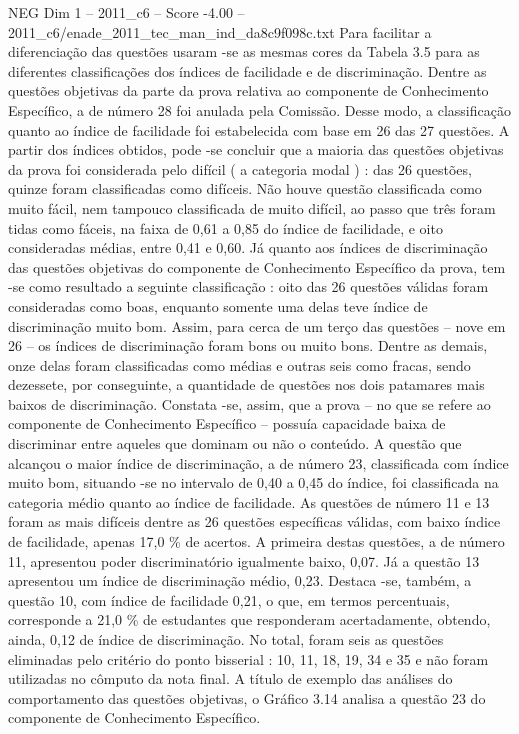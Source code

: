 \begin{textsample}{NEG Dim 1 – 2011\_c6 – Score -4.00 – 2011\_c6/enade\_2011\_tec\_man\_ind\_da8c9f098c.txt}
Para facilitar a diferenciação das questões usaram -se as mesmas cores da Tabela 3.5 para as diferentes classificações dos índices de facilidade e de discriminação.
Dentre as questões objetivas da parte da prova relativa ao componente de Conhecimento Específico, a de número 28 foi anulada pela Comissão.
Desse modo, a classificação quanto ao índice de facilidade foi estabelecida com base em 26 das 27 questões.
A partir dos índices obtidos, pode -se concluir que a maioria das questões objetivas da prova foi considerada pelo difícil ( a categoria modal ) : das 26 questões, quinze foram classificadas como difíceis.
Não houve questão classificada como muito fácil, nem tampouco classificada de muito difícil, ao passo que três foram tidas como fáceis, na faixa de 0,61 a 0,85 do índice de facilidade, e oito consideradas médias, entre 0,41 e 0,60.
Já quanto aos índices de discriminação das questões objetivas do componente de Conhecimento Específico da prova, tem -se como resultado a seguinte classificação : oito das 26 questões válidas foram consideradas como boas, enquanto somente uma delas teve índice de discriminação muito bom.
Assim, para cerca de um terço das questões – nove em 26 – os índices de discriminação foram bons ou muito bons.
Dentre as demais, onze delas foram classificadas como médias e outras seis como fracas, sendo dezessete, por conseguinte, a quantidade de questões nos dois patamares mais baixos de discriminação.
Constata -se, assim, que a prova – no que se refere ao componente de Conhecimento Específico – possuía capacidade baixa de discriminar entre aqueles que dominam ou não o conteúdo.
A questão que alcançou o maior índice de discriminação, a de número 23, classificada com índice muito bom, situando -se no intervalo de 0,40 a 0,45 do índice, foi classificada na categoria médio quanto ao índice de facilidade.
As questões de número 11 e 13 foram as mais difíceis dentre as 26 questões específicas válidas, com baixo índice de facilidade, apenas 17,0 \% de acertos.
A primeira destas questões, a de número 11, apresentou poder discriminatório igualmente baixo, 0,07.
Já a questão 13 apresentou um índice de discriminação médio, 0,23.
Destaca -se, também, a questão 10, com índice de facilidade 0,21, o que, em termos percentuais, corresponde a 21,0 \% de estudantes que responderam acertadamente, obtendo, ainda, 0,12 de índice de discriminação.
No total, foram seis as questões eliminadas pelo critério do ponto bisserial : 10, 11, 18, 19, 34 e 35 e não foram utilizadas no cômputo da nota final.
A título de exemplo das análises do comportamento das questões objetivas, o Gráfico 3.14 analisa a questão 23 do componente de Conhecimento Específico.

\end{textsample}

